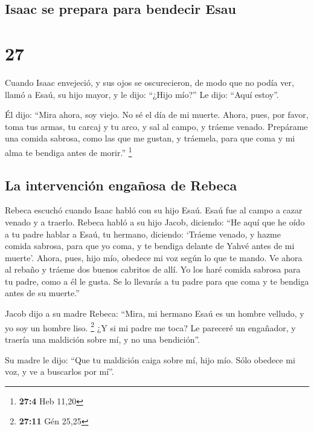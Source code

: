 \hypertarget{isaac-se-prepara-para-bendecir-esau}{%
\subsection{Isaac se prepara para bendecir
Esau}\label{isaac-se-prepara-para-bendecir-esau}}

\hypertarget{section-26}{%
\section{27}\label{section-26}}

 Cuando Isaac envejeció, y sus ojos se oscurecieron, de
modo que no podía ver, llamó a Esaú, su hijo mayor, y le dijo: ``¿Hijo
mío?'' Le dijo: ``Aquí estoy''.

 Él dijo: ``Mira ahora, soy viejo. No sé el día de mi
muerte.  Ahora, pues, por favor, toma tus armas, tu carcaj
y tu arco, y sal al campo, y tráeme venado.  Prepárame una
comida sabrosa, como las que me gustan, y tráemela, para que coma y mi
alma te bendiga antes de morir.'' \footnote{\textbf{27:4} Heb 11,20}

\hypertarget{la-intervenciuxf3n-engauxf1osa-de-rebeca}{%
\subsection{La intervención engañosa de
Rebeca}\label{la-intervenciuxf3n-engauxf1osa-de-rebeca}}

 Rebeca escuchó cuando Isaac habló con su hijo Esaú. Esaú
fue al campo a cazar venado y a traerlo.  Rebeca habló a
su hijo Jacob, diciendo: ``He aquí que he oído a tu padre hablar a Esaú,
tu hermano, diciendo:  `Tráeme venado, y hazme comida
sabrosa, para que yo coma, y te bendiga delante de Yahvé antes de mi
muerte'.  Ahora, pues, hijo mío, obedece mi voz según lo
que te mando.  Ve ahora al rebaño y tráeme dos buenos
cabritos de allí. Yo los haré comida sabrosa para tu padre, como a él le
gusta.  Se lo llevarás a tu padre para que coma y te
bendiga antes de su muerte.''

 Jacob dijo a su madre Rebeca: ``Mira, mi hermano Esaú es
un hombre velludo, y yo soy un hombre liso. \footnote{\textbf{27:11} Gén
  25,25}  ¿Y si mi padre me toca? Le pareceré un
engañador, y traería una maldición sobre mí, y no una bendición''.

 Su madre le dijo: ``Que tu maldición caiga sobre mí,
hijo mío. Sólo obedece mi voz, y ve a buscarlos por mí''.

